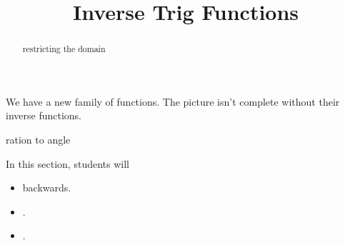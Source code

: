 \documentclass{ximera}
\title{Inverse Trig Functions}
\begin{document}
\begin{abstract}
restricting the domain
\end{abstract}
\maketitle





We have a new family of functions. The picture isn't complete without their inverse functions.



ration to angle














\begin{sectionOutcomes}
In this section, students will 

\begin{itemize}
\item backwards.
\item .
\item .
\end{itemize}
\end{sectionOutcomes}
\end{document}
